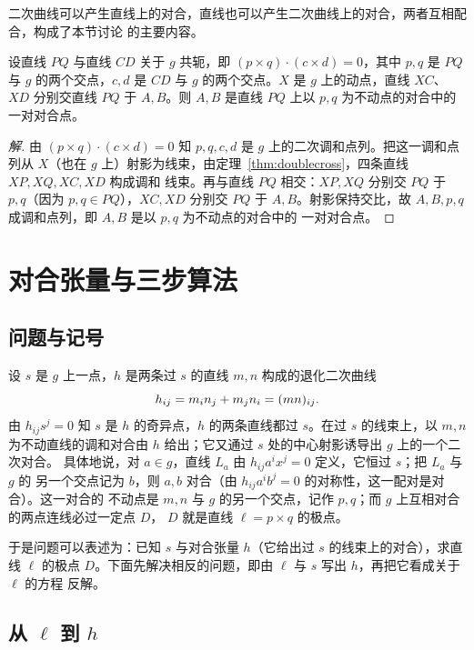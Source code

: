 二次曲线可以产生直线上的对合，直线也可以产生二次曲线上的对合，两者互相配合，构成了本节讨论
的主要内容。

\begin{example}[共轭直线给出的对合]\label{ex:conj}
设直线 $PQ$ 与直线 $CD$ 关于 $g$ 共轭，即 $(p\times q)\cdot(c\times d)=0$，其中 $p,q$ 是
$PQ$ 与 $g$ 的两个交点，$c,d$ 是 $CD$ 与 $g$ 的两个交点。$X$ 是 $g$ 上的动点，直线 $XC$、
$XD$ 分别交直线 $PQ$ 于 $A,B$。则 $A,B$ 是直线 $PQ$ 上以 $p,q$ 为不动点的对合中的一对对合点。
\end{example}

\begin{proof}[解]
由 $(p\times q)\cdot(c\times d)=0$ 知 $p,q,c,d$ 是 $g$ 上的二次调和点列。把这一调和点列从
$X$（也在 $g$ 上）射影为线束，由定理~\ref{thm:doublecross}，四条直线 $XP,XQ,XC,XD$ 构成调和
线束。再与直线 $PQ$ 相交：$XP,XQ$ 分别交 $PQ$ 于 $p,q$（因为 $p,q\in PQ$），$XC,XD$ 分别交
$PQ$ 于 $A,B$。射影保持交比，故 $A,B,p,q$ 成调和点列，即 $A,B$ 是以 $p,q$ 为不动点的对合中的
一对对合点。
\end{proof}

\section{对合张量与三步算法}

\subsection{问题与记号}

设 $s$ 是 $g$ 上一点，$h$ 是两条过 $s$ 的直线 $m,n$ 构成的退化二次曲线
\[
h_{ij}=m_in_j+m_jn_i=(mn)_{ij}.
\]
由 $h_{ij}s^j=0$ 知 $s$ 是 $h$ 的奇异点，$h$ 的两条直线都过 $s$。在过 $s$ 的线束上，以
$m,n$ 为不动直线的调和对合由 $h$ 给出；它又通过 $s$ 处的中心射影诱导出 $g$ 上的一个二次对合。
具体地说，对 $a\in g$，直线 $L_a$ 由 $h_{ij}a^ix^j=0$ 定义，它恒过 $s$；把 $L_a$ 与 $g$ 的
另一个交点记为 $b$，则 $a,b$ 对合（由 $h_{ij}a^ib^j=0$ 的对称性，这一配对是对合）。这一对合的
不动点是 $m,n$ 与 $g$ 的另一个交点，记作 $p,q$；而 $g$ 上互相对合的两点连线必过一定点 $D$，
$D$ 就是直线 $\ell=p\times q$ 的极点。

于是问题可以表述为：已知 $s$ 与对合张量 $h$（它给出过 $s$ 的线束上的对合），求直线 $\ell$
的极点 $D$。下面先解决相反的问题，即由 $\ell$ 与 $s$ 写出 $h$，再把它看成关于 $\ell$ 的方程
反解。

\subsection{从 $\ell$ 到 $h$}

